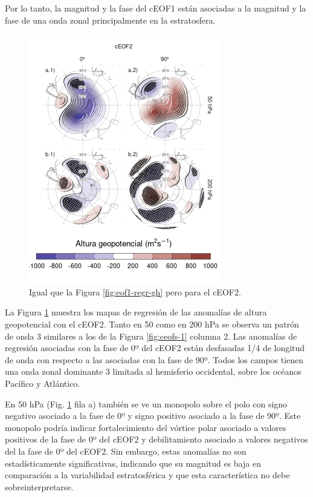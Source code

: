 \documentclass[12pt,oneside]{reedthesis}
\begin{document}
Por lo tanto, la magnitud y la fase del cEOF1 están asociadas a la magnitud y la fase de una onda zonal principalmente en la estratosfera.



\begin{figure}
\includegraphics{figures/20-ceofs/eof2-regr-gh-1} \caption{Igual que la Figura \ref{fig:eof1-regr-gh} pero para el cEOF2.}\label{fig:eof2-regr-gh}
\end{figure}

La Figura \ref{fig:eof2-regr-gh} muestra los mapas de regresión de las anomalías de altura geopotencial con el cEOF2.
Tanto en 50 como en 200 hPa se observa un patrón de onda 3 similares a los de la Figura \ref{fig:ceofs-1} columna 2.
Las anomalías de regresión asociadas con la fase de 0º del cEOF2 están desfasadas 1/4 de longitud de onda con respecto a las asociadas con la fase de 90º.
Todos los campos tienen una onda zonal dominante 3 limitada al hemisferio occidental, sobre los océanos Pacífico y Atlántico.

En 50 hPa (Fig. \ref{fig:eof2-regr-gh} fila a) también se ve un monopolo sobre el polo con signo negativo asociado a la fase de 0º y signo positivo asociado a la fase de 90º.
Este monopolo podría indicar fortalecimiento del vórtice polar asociado a valores positivos de la fase de 0º del cEOF2 y debilitamiento asociado a valores negativos del la fase de 0º del cEOF2.
Sin embargo, estas anomalías no son estadísticamente significativas, indicando que su magnitud es baja en comparación a la variabilidad estratosférica y que esta característica no debe sobreinterpretarse.
\end{document}
